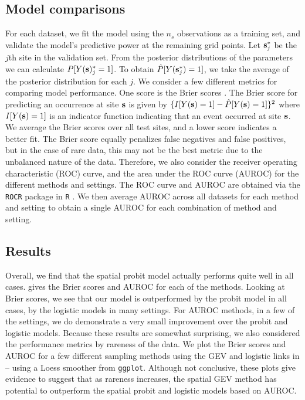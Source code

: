 \subsection{Model comparisons}\label{rbs:cv}
For each dataset, we fit the model using the $n_s$ observations as a training set, and validate the model's predictive power at the remaining grid points.
Let $\mathbf{s}^*_j$ be the $j$th site in the validation set.
From the posterior distributions of the parameters we can calculate $P[Y(\mathbf{s})^*_j = 1]$.
To obtain $\hat{P}[Y(\mathbf{s}^*_j) = 1]$, we take the average of the posterior distribution for each $j$.
We consider a few different metrics for comparing model performance.
One score is the Brier scores \citep[BS]{Gneiting2007}.
The Brier score for predicting an occurrence at site $\mathbf{s}$ is given by $\{I[Y(\mathbf{s})=1] - \hat{P}[Y(\mathbf{s})=1]\}^2$ where $I[Y(\mathbf{s}) = 1]$ is an indicator function indicating that an event occurred at site $\mathbf{s}$.
We average the Brier scores over all test sites, and a lower score indicates a better fit.
The Brier score equally penalizes false negatives and false positives, but in the case of rare data, this may not be the best metric due to the unbalanced nature of the data.
Therefore, we also consider the receiver operating characteristic (ROC) curve, and the area under the ROC curve (AUROC) for the different methods and settings.
The ROC curve and AUROC are obtained via the \texttt{ROCR} \citep{Sing2005} package in \texttt{R} \citep{Rmanual}.
We then average AUROC across all datasets for each method and setting to obtain a single AUROC for each combination of method and setting.

\subsection{Results} \label{rbs:simresults}
Overall, we find that the spatial probit model actually performs quite well in all cases.
 gives the Brier scores and AUROC for each of the methods.
Looking at Brier scores, we see that our model is outperformed by the probit model in all cases, by the logistic models in many settings.
For AUROC methods, in a few of the settings, we do demonstrate a very small improvement over the probit and logistic models.
Because these results are somewhat surprising, we also considered the performance metrics by rareness of the data.
We plot the Brier scores and AUROC for a few different sampling methods using the GEV and logistic links in  --  using a Loess smoother from \texttt{ggplot}.
Although not conclusive, these plots give evidence to suggest that as rareness increases, the spatial GEV method has potential to outperform the spatial probit and logistic models based on AUROC.

